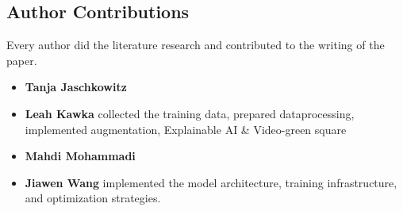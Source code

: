 \clearpage
\setcounter{page}{1}
\maketitlesupplementary

\renewcommand{\thesection}{\arabic{section}}

\subsection{Author Contributions}
\label{sec:author}
Every author did the literature research and contributed to the writing of the paper. 
% 
\begin{itemize}
    \item \textbf{Tanja Jaschkowitz} 
    \item \textbf{Leah Kawka} collected the training data, prepared dataprocessing, implemented augmentation, Explainable AI \& Video-green square
    \item \textbf{Mahdi Mohammadi}
    \item \textbf{Jiawen Wang} implemented the model architecture, training infrastructure, and optimization strategies.
\end{itemize}
% 

